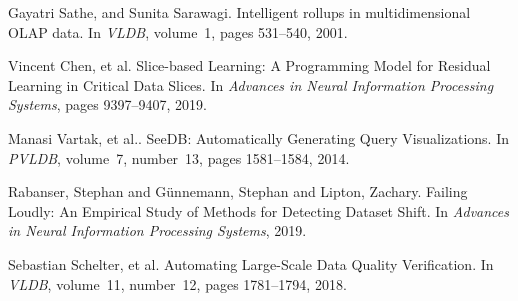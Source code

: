 \documentclass[11pt]{article}
\begin{document}
\begin{thebibliography}{10}
Gayatri Sathe, and Sunita Sarawagi.
\newblock Intelligent rollups in multidimensional OLAP data.
\newblock In {\em VLDB}, volume~1, pages 531--540, 2001.

Vincent Chen, et al.
\newblock Slice-based Learning: A Programming Model for Residual Learning in Critical Data Slices.
\newblock In {\em Advances in Neural Information Processing Systems}, pages 9397--9407, 2019.

Manasi Vartak, et al..
\newblock SeeDB: Automatically Generating Query Visualizations.
\newblock In {\em PVLDB}, volume~7, number~13, pages 1581--1584, 2014.

Rabanser, Stephan and G\"{u}nnemann, Stephan and Lipton, Zachary.
\newblock Failing Loudly: An Empirical Study of Methods for Detecting Dataset Shift.
\newblock In {\em Advances in Neural Information Processing Systems}, 2019.

Sebastian Schelter, et al.
\newblock Automating Large-Scale Data Quality Verification.
\newblock In {\em VLDB}, volume~11, number~12, pages 1781--1794, 2018.


\end{thebibliography}
\end{document}

